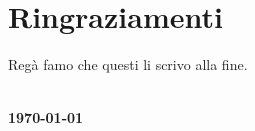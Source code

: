 
\chapter{Ringraziamenti}
\vspace{10pt}
\renewcommand{\baselinestretch}{1.5}
\fontsize{14pt}{14pt}\selectfont
Regà famo che questi li scrivo alla fine.

\begin{flushright}
\fontsize{14pt}{14pt}\selectfont
\textbf{\candidatename}\\
\textbf{\today}
\end{flushright}
\clearpage